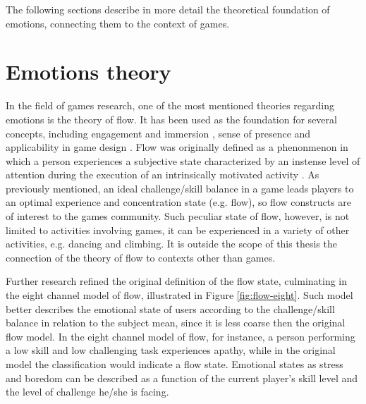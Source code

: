  The following sections describe in more detail the theoretical foundation of emotions, connecting them to the context of games.

\section{Emotions theory}

In the field of games research, one of the most mentioned theories regarding emotions is the theory of flow. It has been used as the foundation for several concepts, including engagement and immersion \parencite{brown2004grounded}, sense of presence \parencite{weibel2011immersion} and applicability in game design \parencite{sweetser2005gameflow, chen2007flow, cruz2017player}. Flow was originally defined as a phenonmenon in which a person experiences a subjective state characterized by an instense level of attention during the execution of an intrinsically motivated activity \parencite{csikszentmihalyi1991flow}. As previously mentioned, an ideal challenge/skill balance in a game leads players to an optimal experience and concentration state (e.g. flow), so flow constructs are of interest to the games community. Such peculiar state of flow, however, is not limited to activities involving games, it can be experienced in a variety of other activities, e.g. dancing and climbing. It is outside the scope of this thesis the connection of the theory of flow to contexts other than games.

Further research \parencite{nakamura2014concept} refined the original definition of the flow state, culminating in the eight channel model of flow, illustrated in Figure \ref{fig:flow-eight}. Such model better describes the emotional state of users according to the challenge/skill balance in relation to the subject mean, since it is less coarse then the original flow model. In the eight channel model of flow, for instance, a person performing a low skill and low challenging task experiences apathy, while in the original model the classification would indicate a flow state. Emotional states as stress and boredom can be described as a function of the current player's skill level and the level of challenge he/she is facing.

